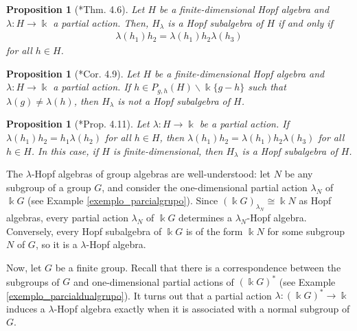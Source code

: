 \documentclass[reqno]{amsart}
\newtheorem{prop}[thm]{Proposition}
\theoremstyle{definition}
\numberwithin{equation}{section}\theoremstyle{plain}
\theoremstyle{definition}
\def \k {\Bbbk}
\begin{document}
\begin{prop}[\cite{corresponding}*{Thm. 4.6}]\label{carac}
	Let $H$ be a finite-dimensional Hopf algebra and $\lambda: H \longrightarrow \k$ a partial action.
	Then, $H_\lambda $ is a Hopf subalgebra of $H$ if and only if
	\begin{align}\label{eq_carac}
		\lambda(h_1)h_2 = \lambda(h_1)h_2\lambda(h_3)
	\end{align}
	for all $ h \in H$.
\end{prop}
  

 \begin{prop}[\cite{corresponding}*{Cor. 4.9}]\label{cor_carac_lambdahopf}  Let $H$ be a finite-dimensional Hopf algebra and   $\lambda: H \longrightarrow \k$ a partial action. If $h\in P_{g,h}(H)\backslash\k\{g-h\}$ such that $\lambda(g)\neq\lambda(h)$, then $H_\lambda$ is not a  Hopf subalgebra of $H$.     
 \end{prop}



 \begin{prop}[\cite{corresponding}*{Prop. 4.11}]\label{cond_mais_forte}
	Let $\lambda: H \longrightarrow \k$ be a partial action.
	If $\lambda(h_1)h_2=h_1 \lambda(h_2)$ for all $h \in H$, then $\lambda(h_1)h_2=\lambda(h_1) h_2 \lambda(h_3)$ for all $h \in H$.
	In this case, if $H$ is finite-dimensional, then
	$H_\lambda$ is a Hopf subalgebra of $H$.
 \end{prop}


The $\lambda$-Hopf algebras of group algebras are well-understood: let $N$ be any subgroup of a group $G$, and consider the one-dimensional partial action $\lambda_N$ of $\k G$ (see Example \ref{exemplo_parcialgrupo}).
Since $(\Bbbk G)_{\lambda_N}\cong \Bbbk N$ as Hopf algebras, every partial action $\lambda_N$ of $\k G$ determines a $\lambda_N$-Hopf algebra. Conversely, every Hopf subalgebra of \(\k G\) is of the form \(\k N\) for some subgroup \(N\) of \(G\), so it is a \(\lambda\)-Hopf algebra. 

\medbreak

Now, let $G$ be a finite group. 
Recall that there is a correspondence between the subgroups of $G$ and one-dimensional partial actions of $\left(\k G\right)^{\ast}$ (see Example \ref{exemplo_parcialdualgrupo}). It turns out that a partial action \(\lambda : (\Bbbk G)^* \to \Bbbk\) induces a \(\lambda\)-Hopf algebra exactly when it is associated with a normal subgroup of \(G\).
 
\end{document}
